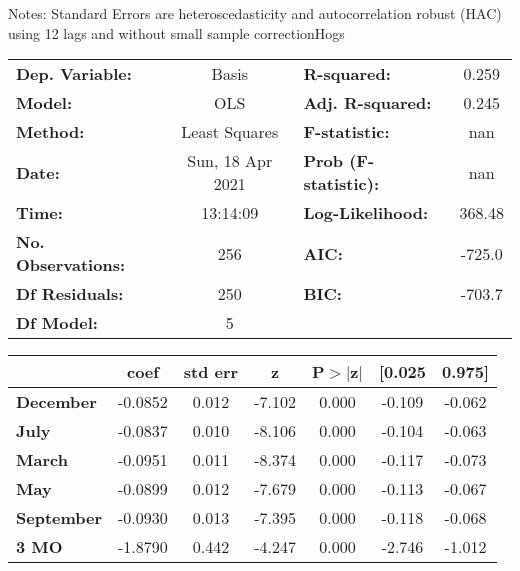Notes: \newline
 [1] Standard Errors are heteroscedasticity and autocorrelation robust (HAC) using 12 lags and without small sample correctionHogs\begin{center}
\begin{tabular}{lclc}
\toprule
\textbf{Dep. Variable:}    &      Basis       & \textbf{  R-squared:         } &     0.259   \\
\textbf{Model:}            &       OLS        & \textbf{  Adj. R-squared:    } &     0.245   \\
\textbf{Method:}           &  Least Squares   & \textbf{  F-statistic:       } &       nan   \\
\textbf{Date:}             & Sun, 18 Apr 2021 & \textbf{  Prob (F-statistic):} &      nan    \\
\textbf{Time:}             &     13:14:09     & \textbf{  Log-Likelihood:    } &    368.48   \\
\textbf{No. Observations:} &         256      & \textbf{  AIC:               } &    -725.0   \\
\textbf{Df Residuals:}     &         250      & \textbf{  BIC:               } &    -703.7   \\
\textbf{Df Model:}         &           5      & \textbf{                     } &             \\
\bottomrule
\end{tabular}
\begin{tabular}{lcccccc}
                   & \textbf{coef} & \textbf{std err} & \textbf{z} & \textbf{P$> |$z$|$} & \textbf{[0.025} & \textbf{0.975]}  \\
\midrule
\textbf{December}  &      -0.0852  &        0.012     &    -7.102  &         0.000        &       -0.109    &       -0.062     \\
\textbf{July}      &      -0.0837  &        0.010     &    -8.106  &         0.000        &       -0.104    &       -0.063     \\
\textbf{March}     &      -0.0951  &        0.011     &    -8.374  &         0.000        &       -0.117    &       -0.073     \\
\textbf{May}       &      -0.0899  &        0.012     &    -7.679  &         0.000        &       -0.113    &       -0.067     \\
\textbf{September} &      -0.0930  &        0.013     &    -7.395  &         0.000        &       -0.118    &       -0.068     \\
\textbf{3 MO}      &      -1.8790  &        0.442     &    -4.247  &         0.000        &       -2.746    &       -1.012     \\

\end{tabular}
\end{center}
